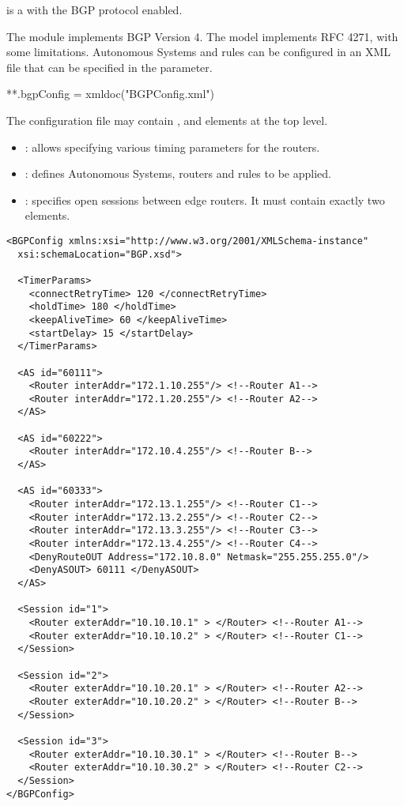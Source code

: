  is a  with the BGP protocol enabled.

The  module implements BGP Version 4. The model implements
RFC 4271, with some limitations. Autonomous Systems and rules can be
configured in an XML file that can be specified in the 
parameter.

\begin{inifile}
**.bgpConfig = xmldoc("BGPConfig.xml")
\end{inifile}

The configuration file may contain ,  and
 elements at the top level.

\begin{itemize}
  \item {}: allows specifying various timing parameters
  for the routers.
  \item {}: defines Autonomous Systems, routers and rules to be applied.
  \item {}: specifies open sessions between edge routers. It must
  contain exactly two  elements.
\end{itemize}

\begin{verbatim}
<BGPConfig xmlns:xsi="http://www.w3.org/2001/XMLSchema-instance"
  xsi:schemaLocation="BGP.xsd">

  <TimerParams>
    <connectRetryTime> 120 </connectRetryTime>
    <holdTime> 180 </holdTime>
    <keepAliveTime> 60 </keepAliveTime>
    <startDelay> 15 </startDelay>
  </TimerParams>

  <AS id="60111">
    <Router interAddr="172.1.10.255"/> <!--Router A1-->
    <Router interAddr="172.1.20.255"/> <!--Router A2-->
  </AS>

  <AS id="60222">
    <Router interAddr="172.10.4.255"/> <!--Router B-->
  </AS>

  <AS id="60333">
    <Router interAddr="172.13.1.255"/> <!--Router C1-->
    <Router interAddr="172.13.2.255"/> <!--Router C2-->
    <Router interAddr="172.13.3.255"/> <!--Router C3-->
    <Router interAddr="172.13.4.255"/> <!--Router C4-->
    <DenyRouteOUT Address="172.10.8.0" Netmask="255.255.255.0"/>
    <DenyASOUT> 60111 </DenyASOUT>
  </AS>

  <Session id="1">
    <Router exterAddr="10.10.10.1" > </Router> <!--Router A1-->
    <Router exterAddr="10.10.10.2" > </Router> <!--Router C1-->
  </Session>

  <Session id="2">
    <Router exterAddr="10.10.20.1" > </Router> <!--Router A2-->
    <Router exterAddr="10.10.20.2" > </Router> <!--Router B-->
  </Session>

  <Session id="3">
    <Router exterAddr="10.10.30.1" > </Router> <!--Router B-->
    <Router exterAddr="10.10.30.2" > </Router> <!--Router C2-->
  </Session>
</BGPConfig>
\end{verbatim}

